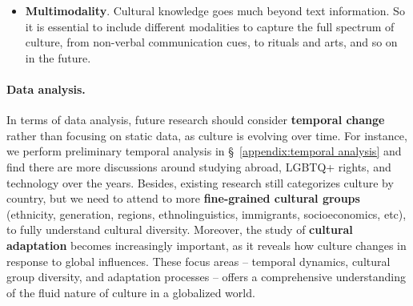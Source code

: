 \documentclass{article} %
\begin{document}
\begin{itemize}

\item \textbf{Multimodality}. Cultural knowledge goes much beyond text information.  So it is essential to include different modalities to capture the full spectrum of culture, from non-verbal communication cues, to rituals and arts, and so on in the future.  
\end{itemize}

\paragraph{Data analysis.} In terms of data analysis, future research should consider \textbf{temporal change} rather than focusing on static data, as culture is evolving over time. For instance,  we perform preliminary temporal analysis in \S~\ref{appendix:temporal analysis} and find there are more discussions around studying abroad, LGBTQ+ rights, and technology over the years. Besides, 
 existing research still categorizes culture by country, but we need to attend to more \textbf{fine-grained cultural groups} (ethnicity, generation, regions, ethnolinguistics, immigrants, socioeconomics, etc), to fully understand cultural diversity. Moreover, the study of \textbf{cultural adaptation} becomes increasingly important, as it reveals how culture changes in response to global influences. These focus areas -- temporal dynamics, cultural group diversity, and adaptation processes -- offers a comprehensive understanding of the fluid nature of culture in a globalized world.
\end{document}
